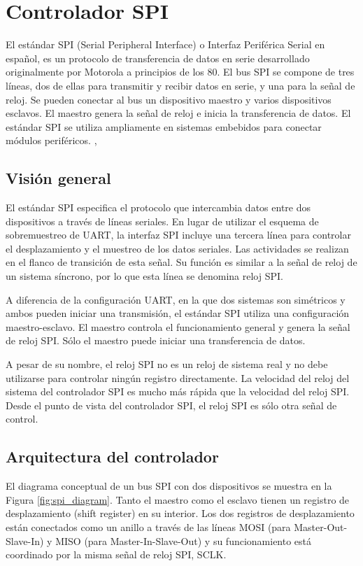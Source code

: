 	\section{Controlador SPI}

    El estándar SPI (Serial Peripheral Interface) o Interfaz Periférica Serial en español, es un protocolo de transferencia de datos en serie desarrollado originalmente por Motorola a principios de los 80. El bus SPI se compone de tres líneas, dos de ellas para transmitir y recibir datos en serie, y una para la señal de reloj. Se pueden conectar al bus un dispositivo maestro y varios dispositivos esclavos. El maestro genera la señal de reloj e inicia la transferencia de datos. El estándar SPI se utiliza ampliamente en sistemas embebidos para conectar módulos periféricos. \cite{Chu2018}, \cite{Chu2008}

    \subsection{Visión general}

    El estándar SPI especifica el protocolo que intercambia datos entre dos dispositivos a través de líneas seriales. En lugar de utilizar el esquema de sobremuestreo de UART, la interfaz SPI incluye una tercera línea para controlar el desplazamiento y el muestreo de los datos seriales. Las actividades se realizan en el flanco de transición de esta señal. Su función es similar a la señal de reloj de un sistema síncrono, por lo que esta línea se denomina reloj SPI.

    A diferencia de la configuración UART, en la que dos sistemas son simétricos y ambos pueden iniciar una transmisión, el estándar SPI utiliza una configuración maestro-esclavo. El maestro controla el funcionamiento general y genera la señal de reloj SPI. Sólo el maestro puede iniciar una transferencia de datos.

    A pesar de su nombre, el reloj SPI no es un reloj de sistema real y no debe utilizarse para controlar ningún registro directamente. La velocidad del reloj del sistema del controlador SPI es mucho más rápida que la velocidad del reloj SPI. Desde el punto de vista del controlador SPI, el reloj SPI es sólo otra señal de control.

    \subsection{Arquitectura del controlador}

    El diagrama conceptual de un bus SPI con dos dispositivos se muestra en la Figura \ref{fig:spi_diagram}. Tanto el maestro como el esclavo tienen un registro de desplazamiento (shift register) en su interior. Los dos registros de desplazamiento están conectados como un anillo a través de las líneas MOSI (para Master-Out-Slave-In) y MISO (para Master-In-Slave-Out) y su funcionamiento está coordinado por la misma señal de reloj SPI, SCLK. 


